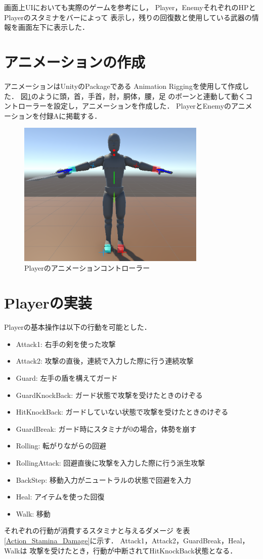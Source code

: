 \documentclass[a4paper,12pt,oneside,openany,titlepage]{jreport}
\begin{document}
 画面上UIにおいても実際のゲームを参考にし，
 Player，EnemyそれぞれのHPとPlayerのスタミナをバーによって
 表示し，残りの回復数と使用している武器の情報を画面左下に表示した．
 
 \section{アニメーションの作成}
 アニメーションはUnityのPackageである
 Animation Rigging\cite{AnimRigging}を使用して作成した．
 図\ref{anim_controller}のように頭，首，手首，肘，胴体，腰，足
 のボーンと連動して動くコントローラーを設定し，アニメーションを作成した．
 PlayerとEnemyのアニメーションを付録Aに掲載する．
\begin{figure}[h]
  \begin{center}
    \includegraphics[width=9cm]{Rigging.png}
    \caption{Playerのアニメーションコントローラー}
    \label{anim_controller}
  \end{center}
\end{figure}

 \section{Playerの実装}
 Playerの基本操作は以下の行動を可能とした．
 {
 \begin{itemize}[itemsep=1pt, leftmargin=27pt, labelsep=5pt, parsep=0pt]
   \item Attack1: 右手の剣を使った攻撃
   \item Attack2: 攻撃の直後，連続で入力した際に行う連続攻撃
   \item Guard: 左手の盾を構えてガード
   \item GuardKnockBack: ガード状態で攻撃を受けたときのけぞる
   \item HitKnockBack: ガードしていない状態で攻撃を受けたときのけぞる
   \item GuardBreak: ガード時にスタミナが0の場合，体勢を崩す
   \item Rolling: 転がりながらの回避
   \item RollingAttack: 回避直後に攻撃を入力した際に行う派生攻撃
   \item BackStep: 移動入力がニュートラルの状態で回避を入力
   \item Heal: アイテムを使った回復
   \item Walk: 移動
 \end{itemize}
 }
 それぞれの行動が消費するスタミナと与えるダメージ
 を表\ref{Action_Stamina_Damage}に示す．
Attack1，Attack2，GuardBreak，Heal，Walkは
攻撃を受けたとき，行動が中断されてHitKnockBack状態となる．
\end{document}
